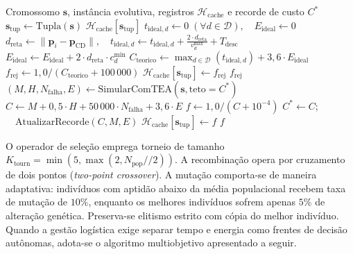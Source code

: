 \begin{algorithm}[htbp]
\caption{Avaliação de Aptidão com Poda Física Teórica e Cache (\textit{Memoization})}\label{alg:fitness_ga}
\begin{algorithmic}[1]
\REQUIRE Cromossomo $\mathbf{s}$, instância evolutiva, registros $\mathcal{H}_{\text{cache}}$ e recorde de custo $C^*$
\STATE $\mathbf{s}_{\text{tup}} \leftarrow \text{Tupla}(\mathbf{s})$
 \RETURN $\mathcal{H}_{\text{cache}}[\mathbf{s}_{\text{tup}}]$ \ENDIF
\STATE $t_{\text{ideal}, d} \leftarrow 0 \; (\forall d \in \mathcal{D}), \quad E_{\text{ideal}} \leftarrow 0$
    \STATE $d_{\text{reta}} \leftarrow \|\mathbf{p}_i - \mathbf{p}_{\text{CD}}\|, \quad t_{\text{ideal}, d} \leftarrow t_{\text{ideal}, d} + \frac{2 \cdot d_{\text{reta}}}{v^{\text{max}}_d} + T_{\text{desc}}$
    \STATE $E_{\text{ideal}} \leftarrow E_{\text{ideal}} + 2 \cdot d_{\text{reta}} \cdot c^{\text{min}}_d$
\ENDFOR
\STATE $C_{\text{teorico}} \leftarrow \max_{d \in \mathcal{D}}(t_{\text{ideal}, d}) + 3{,}6 \cdot E_{\text{ideal}}$
    \STATE $f_{\text{rej}} \leftarrow 1{,}0 / (C_{\text{teorico}} + 100\,000)$
    \STATE $\mathcal{H}_{\text{cache}}[\mathbf{s}_{\text{tup}}] \leftarrow f_{\text{rej}}$
    \RETURN $f_{\text{rej}}$
\ENDIF
\STATE $(M, H, N_{\text{falha}}, E) \leftarrow \text{SimularComTEA}(\mathbf{s}, \text{teto}=C^*)$
\STATE $C \leftarrow M + 0{,}5 \cdot H + 50\,000 \cdot N_{\text{falha}} + 3{,}6 \cdot E$
\STATE $f \leftarrow 1{,}0 / (C + 10^{-4})$
    \STATE $C^* \leftarrow C$; $\quad \text{AtualizarRecorde}(C, M, E)$
\ENDIF
\STATE $\mathcal{H}_{\text{cache}}[\mathbf{s}_{\text{tup}}] \leftarrow f$
\RETURN $f$
\end{algorithmic}
\end{algorithm}

O operador de seleção emprega torneio de tamanho $K_{\text{tourn}} = \min(5, \max(2, N_{\text{pop}}//2))$. A recombinação opera por cruzamento de dois pontos (\textit{two-point crossover}). A mutação comporta-se de maneira adaptativa: indivíduos com aptidão abaixo da média populacional recebem taxa de mutação de $10\%$, enquanto os melhores indivíduos sofrem apenas $5\%$ de alteração genética. Preserva-se elitismo estrito com cópia do melhor indivíduo. Quando a gestão logística exige separar tempo e energia como frentes de decisão autônomas, adota-se o algoritmo multiobjetivo apresentado a seguir.

